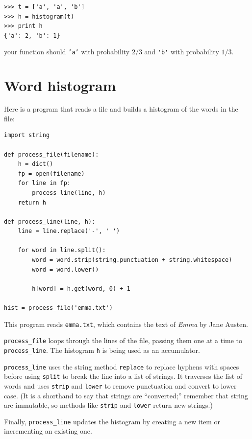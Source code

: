 \documentclass[10pt]{book}
\begin{document}
{\begin{ex}
\beforeverb
\begin{verbatim}
>>> t = ['a', 'a', 'b']
>>> h = histogram(t)
>>> print h
{'a': 2, 'b': 1}
\end{verbatim}
\afterverb
%
your function should {\tt 'a'} with probability $2/3$ and \verb"'b'"
with probability $1/3$.
\end{ex}


\section{Word histogram}

Here is a program that reads a file and builds a histogram of the
words in the file:


\beforeverb
\begin{verbatim}
import string

def process_file(filename):
    h = dict()
    fp = open(filename)
    for line in fp:
        process_line(line, h)
    return h

def process_line(line, h):
    line = line.replace('-', ' ')
    
    for word in line.split():
        word = word.strip(string.punctuation + string.whitespace)
        word = word.lower()

        h[word] = h.get(word, 0) + 1

hist = process_file('emma.txt')
\end{verbatim}
\afterverb
%
This program reads {\tt emma.txt}, which contains the text of {\em
  Emma} by Jane Austen.


\verb"process_file" loops through the lines of the file,
passing them one at a time to \verb"process_line".  The histogram
{\tt h} is being used as an accumulator.


\verb"process_line" uses the string method {\tt replace} to replace
hyphens with spaces before using {\tt split} to break the line into a
list of strings.  It traverses the list of words and uses {\tt strip}
and {\tt lower} to remove punctuation and convert to lower case.  (It
is a shorthand to say that strings are ``converted;'' remember that
string are immutable, so methods like {\tt strip} and {\tt lower}
return new strings.)

Finally, \verb"process_line" updates the histogram by creating a new
item or incrementing an existing one.

}
\end{document}
